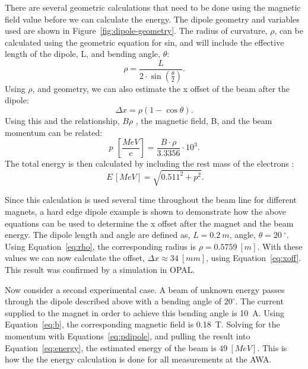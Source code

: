 There are several geometric calculations that need to be done using the magnetic field value
before we can calculate the energy. The dipole geometry and variables used are shown in Figure~\ref{fig:dipole-geometry}.
The radius of curvature, $\rho$, can be calculated using the geometric equation for sin, and 
will include the effective length of the dipole, L, and bending angle, $\theta$:
\begin{equation}
	\rho = \frac{L}{2\cdot \sin(\frac{\theta}{2})}.
\end{equation}\label{eq:rho}
Using $\rho$, and geometry, we can also estimate the x offset of the
beam after the dipole: 
\begin{equation}
	\Delta x = \rho \left( 1- \cos\theta \right).
\end{equation}\label{eq:xoff}
Using this and the relationship, $B\rho$ \cite{Wiedemann},
the magnetic field, B, and the beam momentum can be related: %
\begin{equation}
	p\SI{}{\,\left[\frac{MeV}{c}\right]} = \frac{B\cdot \rho}{3.3356}\cdot 10^3.
	\label{eq:pdipole}
\end{equation}
The total energy is then calculated by including the rest mass of the electrons \cite{Griffiths}:
\begin{equation}
	\SI{}{E\,[MeV]} = \sqrt{0.511^2+p^2}.
	\label{eq:energy}
\end{equation}

Since this calculation is used several time throughout the 
beam line for different magnets, a hard edge dipole example is shown 
to demonstrate how the above equations can be used to determine
the x offset after the magnet and the beam energy. 
The dipole length and angle are defined as, $L=\SI{0.2}{m}$, angle, $\theta=\SI{20}{^\circ}$. 
Using Equation~\ref{eq:rho}, 
the corresponding radius is $\rho = \SI{0.5759}{[m]}$. 
With these values we can now calculate the offset, $\Delta x \approx \SI{34}{[mm]}$, 
using Equation~\ref{eq:xoff}. This result was confirmed by a simulation in OPAL. 

Now consider a second experimental case.
A beam of unknown energy passes through the dipole described above
with a bending angle of $20^\circ$. 
The current supplied to the magnet in order to achieve this bending angle is \SI{10}{A}.
Using Equation~\ref{eq:b}, the corresponding magnetic field is \SI{0.18}{T}.
Solving for the momentum with Equations~\ref{eq:pdipole}, and pulling the 
result into Equation~\ref{eq:energy}, 
the estimated energy of the beam is $\SI{49}{[MeV]}$.
This is how the the energy calculation is done for all measurements at the AWA.



